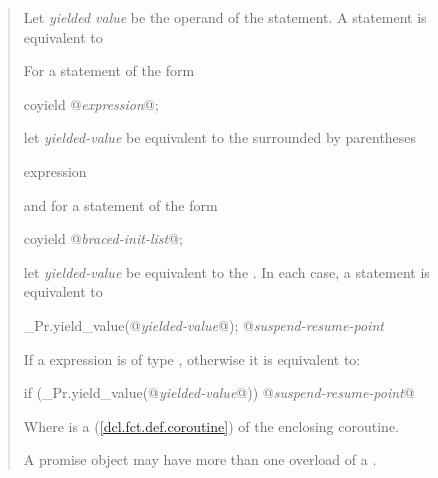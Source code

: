 \begin{quote}

Let \textit{yielded value} be the operand of the  statement. A  statement is equivalent to 


\pnum
For a  statement of the form

\begin{codeblock}
  coyield @\textit{expression}@;
\end{codeblock}

let \textit{yielded-value} be equivalent to the  surrounded
by parentheses


\begin{ncbnf}
  expression
\end{ncbnf}

and for a  statement of the form

\begin{codeblock}
  coyield @\textit{braced-init-list}@;
\end{codeblock}

let \textit{yielded-value} be equivalent to the . In each case,
a  statement is equivalent to

\begin{codeblock}
  _Pr.yield_value(@\textit{yielded-value}@);
  @\textit{suspend-resume-point}
\end{codeblock}

If a  expression is of type , otherwise it is equivalent to:

\begin{codeblock}
  if (_Pr.yield_value(@\textit{yielded-value}@)) {
    @\textit{suspend-resume-point}@
  }
\end{codeblock}

Where  is a  (\ref{dcl.fct.def.coroutine}) of the enclosing coroutine.



\pnum
\enternote
A promise object may have more than one overload of a .


\end{quote}
